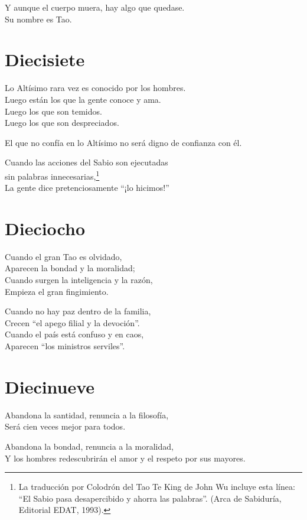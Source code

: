 \documentclass[hidelinks]{memoir}
\begin{document}
	Y aunque el cuerpo muera, hay algo que quedase.\\
	Su nombre es Tao.
	
	\chapter*{Diecisiete}
	
	Lo Altísimo rara vez es conocido por los hombres.\\
	Luego están los que la gente conoce y ama.\\
	Luego los que son temidos.\\
	Luego los que son despreciados.
	
	El que no confía en lo Altísimo no será digno de confianza con él.
	
	Cuando las acciones del Sabio son ejecutadas\\
	sin palabras innecesarias,\footnote{La traducción por Colodrón del Tao Te King de John Wu incluye esta
		línea: ``El Sabio pasa desapercibido y ahorra las palabras''. (Arca de
		Sabiduría, Editorial EDAT, 1993).}\\
	La gente dice pretenciosamente ``¡lo hicimos!''
	
	\chapter*{Dieciocho}
	
	Cuando el gran Tao es olvidado,\\
	Aparecen la bondad y la moralidad;\\
	Cuando surgen la inteligencia y la razón,\\
	Empieza el gran fingimiento.
	
	Cuando no hay paz dentro de la familia,\\
	Crecen ``el apego filial y la devoción''.\\
	Cuando el país está confuso y en caos,\\
	Aparecen ``los ministros serviles''.
	
	\chapter*{Diecinueve}
	
	Abandona la santidad, renuncia a la filosofía,\\
	Será cien veces mejor para todos.
	
	Abandona la bondad, renuncia a la moralidad,\\
	Y los hombres redescubrirán el amor y el respeto por sus mayores.
	
\end{document}

